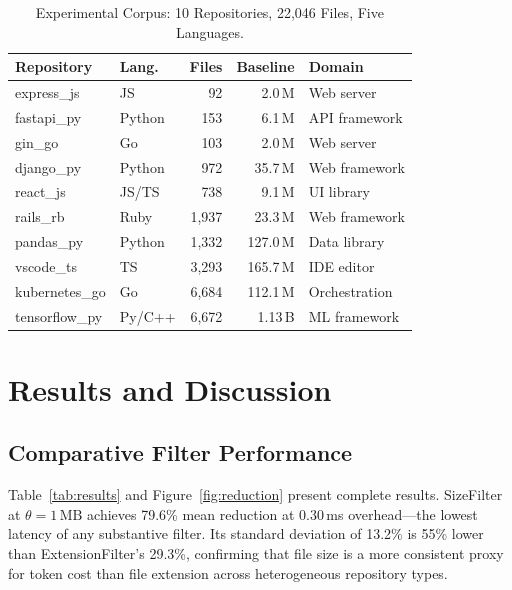 \documentclass[conference]{IEEEtran}
\begin{document}
\begin{table}[t]
  \centering
  \caption{Experimental Corpus: 10 Repositories, 22,046 Files,
  Five Languages.}
  \label{tab:corpus}
  \renewcommand{\arraystretch}{1.15}
  \begin{tabular}{@{}llrrl@{}}
    \toprule
    \textbf{Repository} & \textbf{Lang.} & \textbf{Files} &
    \textbf{Baseline} & \textbf{Domain} \\
    \midrule
    express\_js    & JS     &    92 & 2.0\,M   & Web server    \\
    fastapi\_py    & Python &   153 & 6.1\,M   & API framework \\
    gin\_go        & Go     &   103 & 2.0\,M   & Web server    \\
    django\_py     & Python &   972 & 35.7\,M  & Web framework \\
    react\_js      & JS/TS  &   738 & 9.1\,M   & UI library    \\
    rails\_rb      & Ruby   & 1,937 & 23.3\,M  & Web framework \\
    pandas\_py     & Python & 1,332 & 127.0\,M & Data library  \\
    vscode\_ts     & TS     & 3,293 & 165.7\,M & IDE editor    \\
    kubernetes\_go & Go     & 6,684 & 112.1\,M & Orchestration \\
    tensorflow\_py & Py/C++ & 6,672 & 1.13\,B  & ML framework  \\
    \bottomrule
  \end{tabular}
\end{table}

\section{Results and Discussion}
\label{sec:results}

\subsection{Comparative Filter Performance}

Table~\ref{tab:results} and Figure~\ref{fig:reduction} present
complete results. SizeFilter at $\theta{=}1\,\text{MB}$ achieves
79.6\% mean reduction at 0.30\,ms overhead---the lowest latency of any
substantive filter. Its standard deviation of 13.2\% is 55\% lower
than ExtensionFilter's 29.3\%, confirming that file size is a more
consistent proxy for token cost than file extension across
heterogeneous repository types.
\end{document}
